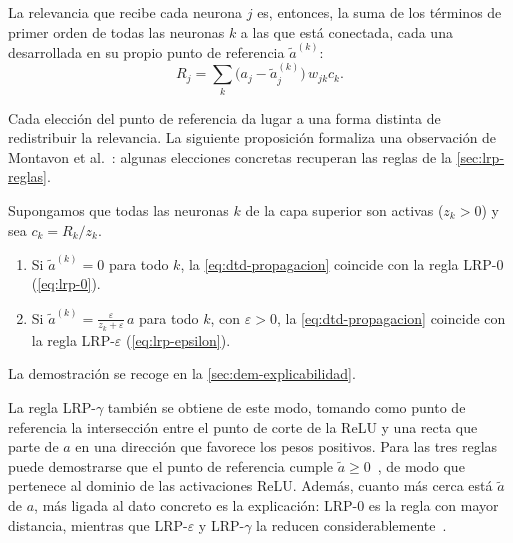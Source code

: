 La relevancia que recibe cada neurona $j$ es, entonces, la suma de los términos
de primer orden de todas las neuronas $k$ a las que está conectada, cada una
desarrollada en su propio punto de referencia $\tilde{a}^{(k)}$:
\begin{equation}\label{eq:dtd-propagacion}
  R_j = \sum_{k} \bigl(a_j - \tilde{a}^{(k)}_j\bigr) \, w_{jk} c_k .
\end{equation}

Cada elección del punto de referencia da lugar a una forma distinta de
redistribuir la relevancia. La siguiente proposición formaliza una observación
de Montavon et al.~\cite{montavon2019lrp}: algunas elecciones concretas
recuperan las reglas de la \cref{sec:lrp-reglas}.

\begin{proposicion}\label{prop:dtd-lrp}
Supongamos que todas las neuronas $k$ de la capa superior son activas
($z_k > 0$) y sea $c_k = R_k / z_k$.
\begin{enumerate}
  \item Si $\tilde{a}^{(k)} = 0$ para todo $k$, la \cref{eq:dtd-propagacion}
  coincide con la regla LRP-0 (\cref{eq:lrp-0}).
  \item Si $\tilde{a}^{(k)} = \frac{\varepsilon}{z_k + \varepsilon}\, a$ para todo
  $k$, con $\varepsilon > 0$, la \cref{eq:dtd-propagacion} coincide con la regla
  LRP-$\varepsilon$ (\cref{eq:lrp-epsilon}).
\end{enumerate}
\end{proposicion}

La demostración se recoge en la \cref{sec:dem-explicabilidad}.

La regla LRP-$\gamma$ también se obtiene de este modo, tomando como punto de
referencia la intersección entre el punto de corte de la ReLU y una recta que
parte de $a$ en una dirección que favorece los pesos positivos. Para las tres
reglas puede demostrarse que el punto de referencia cumple
$\tilde{a} \ge 0$~\cite{montavon2017}, de modo que pertenece al dominio de las
activaciones ReLU. Además, cuanto más cerca está $\tilde{a}$ de $a$, más ligada
al dato concreto es la explicación: LRP-0 es la regla con mayor distancia,
mientras que LRP-$\varepsilon$ y LRP-$\gamma$ la reducen
considerablemente~\cite{montavon2019lrp}.

